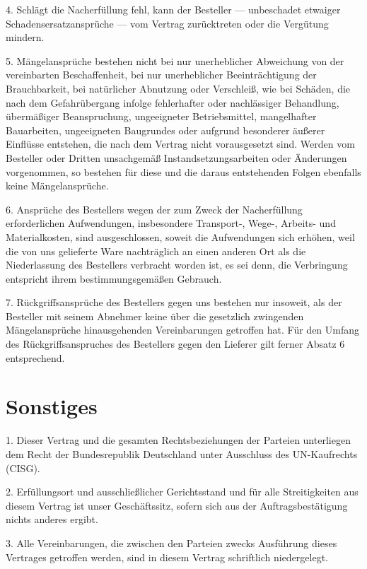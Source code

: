 \documentclass[a4paper, final, 11pt, oneside]{scrartcl}
\begin{document}
\begin{multicols}{2}
4. Schlägt die Nacherfüllung fehl, kann der Besteller — unbeschadet etwaiger Schadensersatzansprüche — vom Vertrag zurücktreten oder die Vergütung mindern.

5. Mängelansprüche bestehen nicht bei nur unerheblicher Abweichung von der vereinbarten Beschaffenheit, bei nur unerheblicher Beeinträchtigung der Brauchbarkeit, bei natürlicher Abnutzung oder Verschleiß, wie bei Schäden, die nach dem Gefahrübergang infolge fehlerhafter oder nachlässiger Behandlung, übermäßiger Beanspruchung, ungeeigneter Betriebsmittel, mangelhafter Bauarbeiten, ungeeigneten Baugrundes oder aufgrund besonderer äußerer Einflüsse entstehen, die nach dem Vertrag nicht vorausgesetzt sind. Werden vom Besteller oder Dritten unsachgemäß Instandsetzungsarbeiten oder Änderungen vorgenommen, so bestehen für diese und die daraus entstehenden Folgen ebenfalls keine Mängelansprüche.

6. Ansprüche des Bestellers wegen der zum Zweck der Nacherfüllung erforderlichen Aufwendungen, insbesondere Transport-, Wege-, Arbeits- und Materialkosten, sind ausgeschlossen, soweit die Aufwendungen sich erhöhen, weil die von uns gelieferte Ware nachträglich an einen anderen Ort als die Niederlassung des Bestellers verbracht worden ist, es sei denn, die Verbringung entspricht ihrem bestimmungsgemäßen Gebrauch.

7. Rückgriffsansprüche des Bestellers gegen uns bestehen nur insoweit, als der Besteller mit seinem Abnehmer keine über die gesetzlich zwingenden Mängelansprüche hinausgehenden Vereinbarungen getroffen hat. Für den Umfang des Rückgriffsanspruches des Bestellers gegen den Lieferer gilt ferner Absatz 6 entsprechend.

\section{Sonstiges}
1. Dieser Vertrag und die gesamten Rechtsbeziehungen der Parteien unterliegen dem Recht der Bundesrepublik Deutschland unter Ausschluss des UN-Kaufrechts (CISG).

2. Erfüllungsort und ausschließlicher Gerichtsstand und für alle Streitigkeiten aus diesem Vertrag ist unser Geschäftssitz, sofern sich aus der Auftragsbestätigung nichts anderes ergibt.

3. Alle Vereinbarungen, die zwischen den Parteien zwecks Ausführung dieses Vertrages getroffen werden, sind in diesem Vertrag schriftlich niedergelegt.

\end{multicols}
\end{document}
